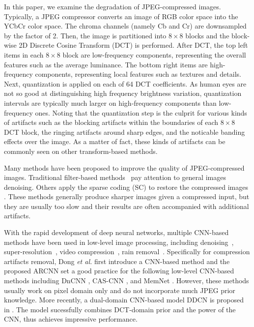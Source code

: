 \documentclass{article}
\begin{document}
In this paper, we examine the degradation of JPEG-compressed images.
Typically, a JPEG compressor converts an image of RGB color space into
the YCbCr color space. The chroma channels (namely Cb and Cr) are downsampled
by the factor of 2. Then, the image is partitioned into $8 \times 8$ blocks and
the block-wise 2D Discrete Cosine Transform (DCT) is performed. After DCT,
the top left items in each $8 \times 8$ block are low-frequency components,
representing the overall features such as the average luminance. The bottom right
items are high-frequency components, representing local features such as
textures and details. Next, quantization is applied on each of
64 DCT coefficients. As human eyes are not so good at distinguishing
high frequency brightness variation, quantization intervals are typically
much larger on high-frequency components than low-frequency ones.
Noting that the quantization step is the culprit for various kinds of artifacts
such as the blocking artifacts within the boundaries of each $8 \times 8$
DCT block, the ringing artifacts around sharp edges, and the noticable
banding effects over the image. As a matter of fact, these kinds of artifacts
can be commonly seen on other transform-based methods.

Many methods have been proposed to improve the quality of JPEG-compressed
images. Traditional filter-based methods~\cite{foi2007pointwise,dabov2007image}
pay attention to general images denoising. Others apply the sparse coding (SC)
to restore the compressed images \cite{chang2014reducing,liu2015data}.
These methods generally produce sharper images given a compressed input,
but they are usually too slow and their results are often accompanied
with additional artifacts.

With the rapid development of deep neural networks, multiple CNN-based methods
have been used in low-level image processing,
including denoising~\cite{zhang2017beyond,zhang2018dynamically},
super-resolution~\cite{Dong2016SRCNN,Yang2018MALDEC,YANG201879},
video compression~\cite{yueyu_2018_DCC,Sifeng_2018_DCC},
rain removal~\cite{Fu_2017_CVPR,Qian_2018_CVPR,Jiaying_2018_CVPR}.
Specifically for compression artifacts removal, Dong \textit{et al.}
\cite{dong2015compression} first introduce a CNN-based method and
the proposed ARCNN set a good practice for the following low-level CNN-based
methods including DnCNN \cite{zhang2017beyond}, CAS-CNN \cite{cavigelli2017cas},
and MemNet \cite{tai2017memnet}.
However, these methods usually work on pixel domain only and do not
incorporate much JPEG prior knowledge. More recently, a dual-domain
CNN-based model DDCN is proposed in  \cite{guo2016building}.
The model sucessfully combines DCT-domain prior and the power of
the CNN, thus achieves impressive performance.
\end{document}
